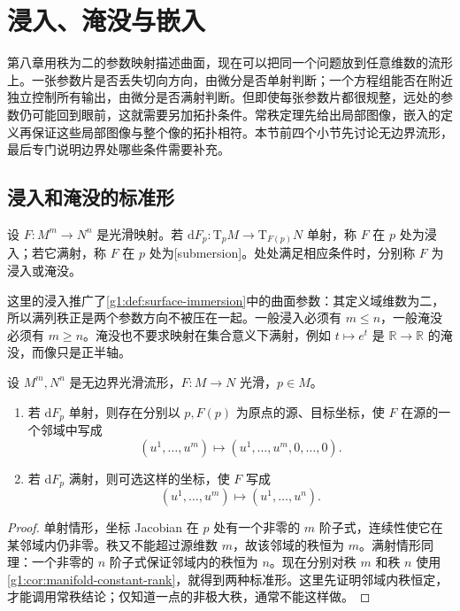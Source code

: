 
% 
% 
% 

\section{浸入、淹没与嵌入}
\label{g1:sec:1104}

第八章用秩为二的参数映射描述曲面，现在可以把同一个问题放到任意维数的流形上。一张参数片是否丢失切向方向，由微分是否单射判断；一个方程组能否在附近独立控制所有输出，由微分是否满射判断。但即使每张参数片都很规整，远处的参数仍可能回到眼前，这就需要另加拓扑条件。常秩定理先给出局部图像，嵌入的定义再保证这些局部图像与整个像的拓扑相符。本节前四个小节先讨论无边界流形，最后专门说明边界处哪些条件需要补充。

\subsection{浸入和淹没的标准形}
\label{g1:subsec:1104:01}

\begin{definition}\label{g1:def:immersion-submersion}
	设 \(F:M^m\to N^n\) 是光滑映射。若 \(\mathrm{d}F_p:\mathrm{T}_pM\to \mathrm{T}_{F(p)}N\) 单射，称 \(F\) 在 \(p\) 处为浸入；若它满射，称 \(F\) 在 \(p\) 处为[submersion]。处处满足相应条件时，分别称 \(F\) 为浸入或淹没。
\end{definition}

这里的浸入推广了\cref{g1:def:surface-immersion}中的曲面参数：其定义域维数为二，所以满列秩正是两个参数方向不被压在一起。一般浸入必须有 \(m\le n\)，一般淹没必须有 \(m\ge n\)。淹没也不要求映射在集合意义下满射，例如 \(t\mapsto e^t\) 是 \(\mathbb R\to\mathbb R\) 的淹没，而像只是正半轴。

\begin{theorem}\label{g1:thm:immersion-submersion-normal-form}
	设 \(M^m,N^n\) 是无边界光滑流形，\(F:M\to N\) 光滑，\(p\in M\)。
	\begin{enumerate}
		\item 若 \(\mathrm{d}F_p\) 单射，则存在分别以 \(p,F(p)\) 为原点的源、目标坐标，使 \(F\) 在源的一个邻域中写成
		\[
			(u^1,\ldots,u^m)\longmapsto(u^1,\ldots,u^m,0,\ldots,0).
		\]
		\item 若 \(\mathrm{d}F_p\) 满射，则可选这样的坐标，使 \(F\) 写成
		\[
			(u^1,\ldots,u^m)\longmapsto(u^1,\ldots,u^n).
		\]
	\end{enumerate}
\end{theorem}
\begin{proof}
	单射情形，坐标 Jacobian 在 \(p\) 处有一个非零的 \(m\) 阶子式，连续性使它在某邻域内仍非零。秩又不能超过源维数 \(m\)，故该邻域的秩恒为 \(m\)。满射情形同理：一个非零的 \(n\) 阶子式保证邻域内的秩恒为 \(n\)。现在分别对秩 \(m\) 和秩 \(n\) 使用\cref{g1:cor:manifold-constant-rank}，就得到两种标准形。这里先证明邻域内秩恒定，才能调用常秩结论；仅知道一点的非极大秩，通常不能这样做。
\end{proof}

